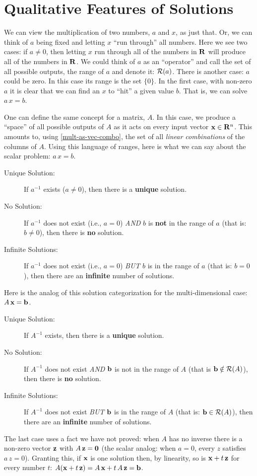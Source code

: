 \documentclass{article}
\begin{document}
\section{Qualitative Features of Solutions}
We can view the multiplication of two numbers, $a$ and $x$, as just that.
Or, we can think of $a$ being fixed and letting $x$ ``run through'' all
numbers. Here we see two cases: if $a \neq 0$, then letting $x$ run
through all of the numbers in ${\bf R}$ will produce all of the numbers in ${\bf R}$.
We could think of $a$ as an ``operator'' and call the set of all possible
outputs, the range of $a$ and denote it: ${\cal R}(a)$.
There is another case: $a$ could be zero. In this case its range is the
set $\{0\}$. In the first case, with non-zero $a$ it is clear that we can
find an $x$ to ``hit'' a given value $b$. That is, we can solve $a\, x = b$.

One can define the same concept for a matrix, $A$. In this case, we produce a
``space'' of all possible outputs of $A$ as it acts on every input vector
${\bf x} \in {\bf R}^n$. This amounts to, using \eqref{mult-as-vec-combo},
the set of all {\em linear combinations\/} of the columns of $A$. Using this
language of ranges, here is what we can say about the scalar problem:
$a \, x = b$.
\begin{description}
	\item[Unique Solution:] If $a^{-1}$ exists ($a \neq 0$),
		then there is a {\bf unique\/} solution.
	\item[No Solution:] If $a^{-1}$ does not exist (i.e., $a = 0$) {\em AND\/}
		$b$ is {\bf not\/} in the range of $a$ (that is: $b \ne 0$), then there is {\bf no\/} solution.
	\item[Infinite Solutions:] If $a^{-1}$ does not exist (i.e., $a = 0$) {\em BUT\/}
		$b$ is in the range of $a$ (that is: $b = 0$),
		then there are an {\bf infinite\/} number of solutions.
\end{description}

Here is the analog of this solution categorization for the multi-dimensional case: $A \, {\bf x} = {\bf b}$.
\begin{description}
	\item[Unique Solution:] If $A^{-1}$ exists,
		then there is a {\bf unique\/} solution.
	\item[No Solution:] If $A^{-1}$ does not exist {\em AND\/}
		${\bf b}$ is not in the range of $A$ (that is ${\bf b} \notin {\cal R}(A)$),
		then there is {\bf no\/} solution.
	\item[Infinite Solutions:] If $A^{-1}$ does not exist {\em BUT\/}
		${\bf b}$ is in the range of $A$ (that is: ${\bf b} \in {\cal R}(A)$),
		then there are an {\bf infinite\/} number of solutions.
\end{description}
The last case uses a fact we have not proved: when $A$ has no inverse there
is a non-zero vector ${\bf z}$ with $A \, {\bf z} = {\bf 0}$ (the scalar
analog: when $a = 0$, every $z$ satisfies $a \, z = 0$). Granting this, if
${\bf x}$ is one solution then, by linearity, so is ${\bf x} + t \, {\bf z}$
for every number $t$:
$A({\bf x} + t\, {\bf z}) = A \, {\bf x} + t \, A \, {\bf z} = {\bf b}$.
\end{document}
